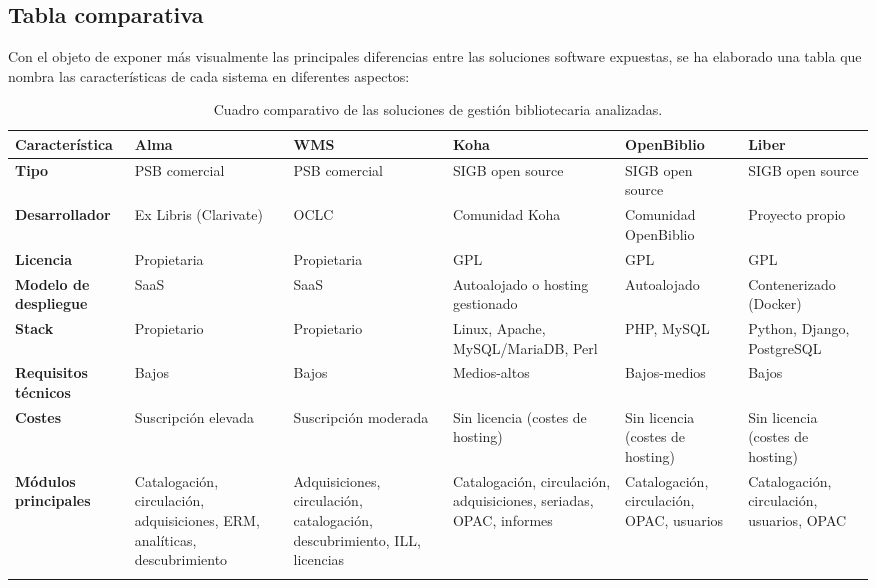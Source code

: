 \subsection{Tabla comparativa}
Con el objeto de exponer más visualmente las principales diferencias entre las soluciones software expuestas, se ha elaborado una tabla que nombra las características de cada sistema en diferentes aspectos:
\newpage
\thispagestyle{empty}
\begin{table}[H]
	\vspace{-1cm}
	\centering
	\caption{Cuadro comparativo de las soluciones de gestión bibliotecaria analizadas.}
	\label{tab:comparativa_soluciones}
	\small
	\begin{tabularx}{\textwidth}{p{2.5cm} X X X X X}
		\toprule
		\textbf{Característica} & \textbf{Alma} & \textbf{WMS} & \textbf{Koha} & \textbf{OpenBiblio} & \textbf{Liber} \\
		\midrule
		
		\textbf{Tipo} & PSB comercial & PSB comercial & SIGB open source & SIGB open source & SIGB open source \\
		\addlinespace
		
		\textbf{Desarrollador} & Ex Libris (Clarivate) & OCLC & Comunidad Koha & Comunidad OpenBiblio & Proyecto propio \\
		\addlinespace
		
		\textbf{Licencia} & Propietaria & Propietaria & GPL & GPL & GPL \\
		\addlinespace
		
		\textbf{Modelo de despliegue} & SaaS & SaaS & Autoalojado o hosting gestionado & Autoalojado & Contenerizado (Docker) \\
		\addlinespace
		
		\textbf{Stack} & Propietario & Propietario & Linux, Apache, MySQL/MariaDB, Perl & PHP, MySQL & Python, Django, PostgreSQL \\
		\addlinespace
		
		\textbf{Requisitos técnicos} & Bajos & Bajos & Medios-altos & Bajos-medios & Bajos \\
		\addlinespace
		
		\textbf{Costes} & Suscripción elevada & Suscripción moderada & Sin licencia (costes de hosting) & Sin licencia (costes de hosting) & Sin licencia (costes de hosting)\\
		\addlinespace
		
		\textbf{Módulos principales} & Catalogación, circulación, adquisiciones, ERM, analíticas, descubrimiento & Adquisiciones, circulación, catalogación, descubrimiento, ILL, licencias & Catalogación, circulación, adquisiciones, seriadas, OPAC, informes & Catalogación, circulación, OPAC, usuarios & Catalogación, circulación, usuarios, OPAC \\
		\addlinespace
		

\end{tabularx}
\end{table}

